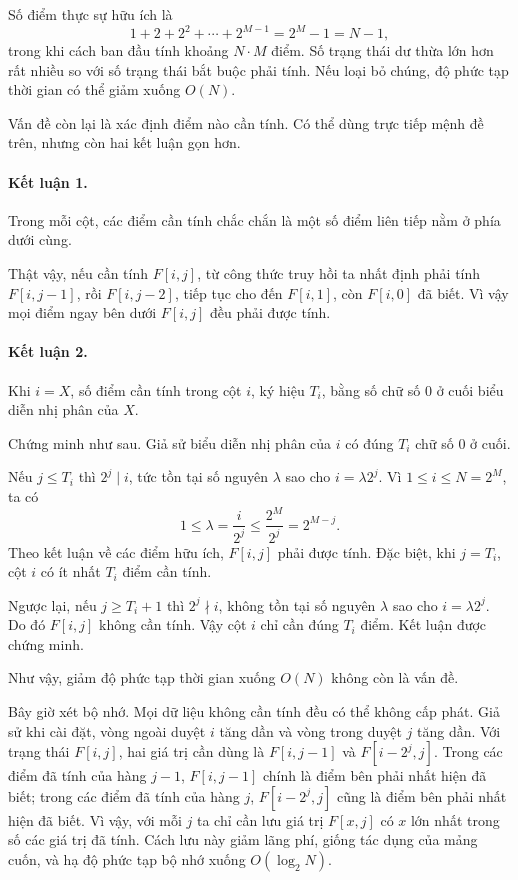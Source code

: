 \documentclass[11pt]{article}
\begin{document}
Số điểm thực sự hữu ích là
\[
  1+2+2^2+\cdots+2^{M-1}=2^M-1=N-1,
\]
trong khi cách ban đầu tính khoảng $N\cdot M$ điểm. Số trạng thái dư thừa lớn
hơn rất nhiều so với số trạng thái bắt buộc phải tính. Nếu loại bỏ chúng, độ
phức tạp thời gian có thể giảm xuống $O(N)$.

Vấn đề còn lại là xác định điểm nào cần tính. Có thể dùng trực tiếp mệnh đề
trên, nhưng còn hai kết luận gọn hơn.

\paragraph{Kết luận 1.}
Trong mỗi cột, các điểm cần tính chắc chắn là một số điểm liên tiếp nằm ở
phía dưới cùng.

Thật vậy, nếu cần tính $F[i,j]$, từ công thức truy hồi ta nhất định phải tính
$F[i,j-1]$, rồi $F[i,j-2]$, tiếp tục cho đến $F[i,1]$, còn $F[i,0]$ đã biết.
Vì vậy mọi điểm ngay bên dưới $F[i,j]$ đều phải được tính.

\paragraph{Kết luận 2.}
Khi $i=X$, số điểm cần tính trong cột $i$, ký hiệu $T_i$, bằng số chữ số $0$
ở cuối biểu diễn nhị phân của $X$.

Chứng minh như sau. Giả sử biểu diễn nhị phân của $i$ có đúng $T_i$ chữ số
$0$ ở cuối.

Nếu $j\le T_i$ thì $2^j\mid i$, tức tồn tại số nguyên $\lambda$ sao cho
$i=\lambda 2^j$. Vì $1\le i\le N=2^M$, ta có
\[
  1\le \lambda=\frac{i}{2^j}\le \frac{2^M}{2^j}=2^{M-j}.
\]
Theo kết luận về các điểm hữu ích, $F[i,j]$ phải được tính. Đặc biệt, khi
$j=T_i$, cột $i$ có ít nhất $T_i$ điểm cần tính.

Ngược lại, nếu $j\ge T_i+1$ thì $2^j\nmid i$, không tồn tại số nguyên
$\lambda$ sao cho $i=\lambda 2^j$. Do đó $F[i,j]$ không cần tính. Vậy cột
$i$ chỉ cần đúng $T_i$ điểm. Kết luận được chứng minh.

Như vậy, giảm độ phức tạp thời gian xuống $O(N)$ không còn là vấn đề.

Bây giờ xét bộ nhớ. Mọi dữ liệu không cần tính đều có thể không cấp phát.
Giả sử khi cài đặt, vòng ngoài duyệt $i$ tăng dần và vòng trong duyệt $j$ tăng
dần. Với trạng thái $F[i,j]$, hai giá trị cần dùng là $F[i,j-1]$ và
$F[i-2^j,j]$. Trong các điểm đã tính của hàng $j-1$, $F[i,j-1]$ chính là điểm
bên phải nhất hiện đã biết; trong các điểm đã tính của hàng $j$,
$F[i-2^j,j]$ cũng là điểm bên phải nhất hiện đã biết. Vì vậy, với mỗi $j$ ta
chỉ cần lưu giá trị $F[x,j]$ có $x$ lớn nhất trong số các giá trị đã tính.
Cách lưu này giảm lãng phí, giống tác dụng của mảng cuốn, và hạ độ phức tạp
bộ nhớ xuống $O(\log_2 N)$.
\end{document}
